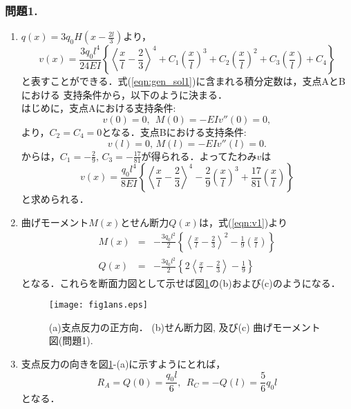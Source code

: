 \documentclass[10pt,a4j]{jarticle}
\begin{document}
\subsubsection*{問題1. }
\begin{enumerate}
\item
	$q(x)=3q_0H\left(x-\frac{2l}{3}\right)$より，
\begin{equation}
	v(x)=\frac{3q_0l^4}{24EI}\left\{
			\left< \frac{x}{l} -\frac{2}{3} \right>^4
			+
			C_1\left(\frac{x}{l}\right)^3
			+
			C_2\left(\frac{x}{l}\right)^2
			+
			C_3\left(\frac{x}{l}\right)
			+
			C_4
		\right\}
		\label{eqn:gen_sol1}
\end{equation}
と表すことができる．式(\ref{eqn:gen_sol1})に含まれる積分定数は，支点AとBにおける
支持条件から，以下のように決まる．\\
はじめに，支点Aにおける支持条件:
\begin{equation}
	v(0)=0, \ \ M(0)=-EIv''(0) =0,
	\label{eqn:BC1_A}
\end{equation}
より，$C_2=C_4=0$となる．支点Bにおける支持条件:
\begin{equation}
	v(l) =0, \, M(l)=-EIv''(l)=0.
	\label{eqn:BC1_B}
\end{equation}
からは，$C_1=-\frac{2}{9},\, C_3=-\frac{17}{81}$が得られる．よってたわみ$v$は
\begin{equation}
	v(x)=\frac{q_0l^4}{8EI}\left\{
			\left< \frac{x}{l} -\frac{2}{3} \right>^4
			-
			\frac{2}{9}	
			\left(\frac{x}{l}\right)^3
			+
			\frac{17}{81}	
			\left(\frac{x}{l}\right)
			\right\}
	\label{eqn:v1}
\end{equation}
と求められる．
\item
曲げモーメント$M(x)$とせん断力$Q(x)$は，式(\ref{eqn:v1})より
\begin{eqnarray}
	M(x) &=& 
		-\frac{3q_0l^2}{2}
		\left\{	
			\left< \frac{x}{l} -\frac{2}{3} \right>^2
			-
			\frac{1}{9}
			\left(\frac{x}{l}\right)
		\right\}
	\label{eqn:M1}
	\\
	Q(x) &=&
		-\frac{3q_0l^2}{2}
		\left\{
		2 \left<\frac{x}{l} -\frac{2}{3}\right>
		-\frac{1}{9}
		\right\}
	\label{eqn:Q1}
\end{eqnarray}
となる．これらを断面力図として示せば図\ref{fig:fig1}の(b)および(c)のようになる．
\begin{figure}[h]
	\begin{center}
	\texttt{[image: fig1ans.eps]} 
	\end{center}
	\vspace{-5mm}
	\caption{(a)支点反力の正方向．
	(b)せん断力図, 及び(c) 曲げモーメント図(問題1).}
	\label{fig:fig1}
\end{figure}
\item
支点反力の向きを図\ref{fig:fig1}-(a)に示すようにとれば，
\begin{equation}
	R_A =  Q(0) = \frac{q_0l}{6}, \ \ 
	R_C = -Q(l) = \frac{5}{6}q_0l
\end{equation}
となる．
\end{enumerate}
\end{document}
